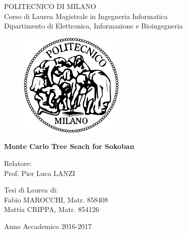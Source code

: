 \thispagestyle{empty}
\vspace*{-1.5cm} \bfseries{
\begin{center}
\large
POLITECNICO DI MILANO\\
\normalsize
Corso di Laurea Magistrale in Ingegneria Informatica\\
Dipartimento di Elettronica, Informazione e Bioingegneria\\
\begin{figure}[htbp]
\begin{center}
\includegraphics[width=5cm]{pictures/logopm.png}
\end{center}
\end{figure}
\vspace*{0.3cm} \LARGE


\textbf{Monte Carlo Tree Seach for Sokoban}\\

  
\end{center}
\vspace*{3.0cm} \large
\begin{flushleft}

Relatore:\\
Prof. Pier Luca LANZI \\

\end{flushleft}
\vspace*{1.0cm}
\begin{flushright}

Tesi di Laurea di:\\
Fabio MAROCCHI, Matr. 858408\\
Mattia CRIPPA, Matr. 854126

\end{flushright}
\vspace*{1cm}
\begin{center}

Anno Accademico 2016-2017
\end{center}
\clearpage
}
